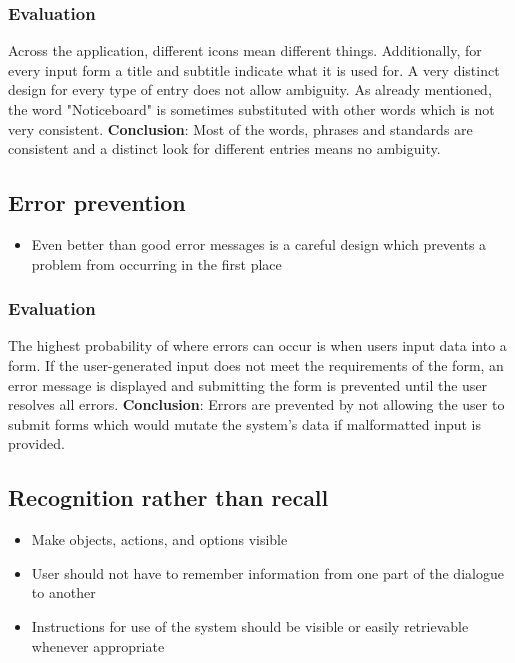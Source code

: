 \subsubsection{Evaluation}
Across the application, different icons mean different things. Additionally, for every input form a title and subtitle indicate what it is used for. A very distinct design for every type of entry does not allow ambiguity. As already mentioned, the word "Noticeboard" is sometimes substituted with other words which is not very consistent. \textbf{Conclusion}: Most of the words, phrases and standards are consistent and a distinct look for different entries means no ambiguity.

\subsection{Error prevention}

\begin{itemize}
    \item Even better than good error messages is a careful design which prevents a problem from occurring in the first place
\end{itemize}

\subsubsection{Evaluation}
The highest probability of where errors can occur is when users input data into a form. If the user-generated input does not meet the requirements of the form, an error message is displayed and submitting the form is prevented until the user resolves all errors. \textbf{Conclusion}: Errors are prevented by not allowing the user to submit forms which would mutate the system's data if malformatted input is provided.

\subsection{Recognition rather than recall}

\begin{itemize}
    \item Make objects, actions, and options visible
    \item User should not have to remember information from one part of the dialogue to another
    \item Instructions for use of the system should be visible or easily retrievable whenever appropriate
\end{itemize}

